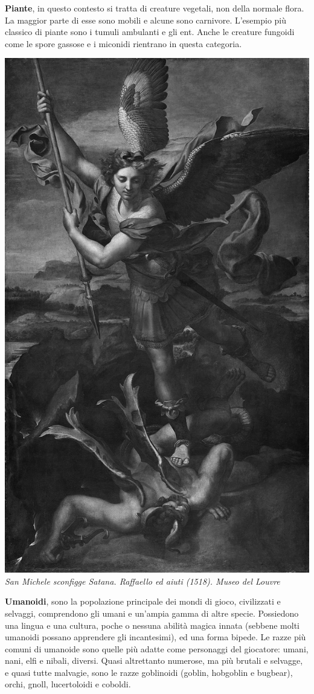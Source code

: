 \begin{multicols}{2}
\smallskip\textbf{Piante}, in questo contesto si tratta di creature vegetali, non della normale flora. La maggior parte di esse sono mobili e alcune sono carnivore. L'esempio più classico di piante sono i tumuli ambulanti e gli ent. Anche le creature fungoidi come le spore gassose e i miconidi rientrano in questa categoria.

\begin{center}
\includegraphics[width=0.7\linewidth]{immagini/sanmichelesatana.png}\\
\emph{San Michele sconfigge Satana. Raffaello ed aiuti (1518). Museo del Louvre}
\end{center}

\smallskip\textbf{Umanoidi}, sono la popolazione principale dei mondi di gioco, civilizzati e selvaggi, comprendono gli umani e un'ampia gamma di altre specie. Possiedono una lingua e una cultura, poche o nessuna abilità magica innata (sebbene molti umanoidi possano apprendere gli incantesimi), ed una forma bipede. Le razze più comuni di umanoide sono quelle più adatte come personaggi del giocatore: umani, nani, elfi e nibali, diversi. Quasi altrettanto numerose, ma più brutali e selvagge, e quasi tutte malvagie, sono le razze goblinoidi (goblin, hobgoblin e bugbear), orchi, gnoll, lucertoloidi e coboldi.


\end{multicols}
